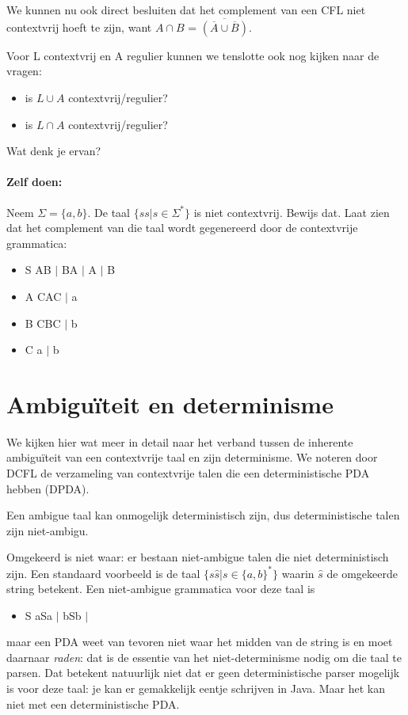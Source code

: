 We kunnen nu ook direct besluiten dat het complement van een CFL niet
contextvrij hoeft te zijn, want
%
$A \cap B$ = $\overline{(\overline{A} \cup \overline{B})}$.


Voor L contextvrij en A regulier kunnen we tenslotte ook nog kijken
naar de vragen:

\begin{itemize}
\item is $L \cup A$ contextvrij/regulier?
\item is $L \cap A$ contextvrij/regulier?
\end{itemize}

Wat denk je ervan?

\paragraph{Zelf doen:} Neem
%
$\Sigma = \{a,b\}$. De taal $\{ss|s \in \Sigma^*\}$ is niet
contextvrij. Bewijs dat. Laat zien dat het
\label{zelfdoen1} complement van die taal wordt gegenereerd door de
contextvrije grammatica:
\begin{itemize}
\item S \rpijl AB $|$ BA $|$ A $|$ B
\item A \rpijl CAC $|$ a
\item B \rpijl CBC $|$ b
\item C \rpijl a $|$ b
\end{itemize}

\clearpage
\section{Ambigu\"{i}teit en determinisme}

We kijken hier wat meer in detail naar het verband tussen de inherente
ambigu\"{i}teit van een contextvrije taal en zijn determinisme. We noteren
door DCFL de verzameling van contextvrije talen die een
deterministische PDA hebben (DPDA).


Een ambigue taal kan onmogelijk deterministisch zijn, dus
deterministische talen zijn niet-ambigu.  


Omgekeerd is niet waar: er bestaan niet-ambigue talen die niet
deterministisch zijn. Een standaard voorbeeld is 
de taal $\{ s\hat{s} | s \in \{a,b\}^*\}$ waarin $\hat{s}$ de omgekeerde
string betekent. Een niet-ambigue grammatica voor deze taal is
\begin{itemize}
\item[] S \rpijl aSa $|$ bSb $|$ \eps
\end{itemize}
maar een PDA weet van tevoren niet waar het midden van de string is en
moet daarnaar {\em raden}: dat is de essentie van het
niet-determinisme nodig om die taal te parsen. Dat betekent natuurlijk
niet dat er geen deterministische parser mogelijk is voor deze taal:
je kan er gemakkelijk eentje schrijven in Java. Maar het kan niet met
een deterministische PDA.


